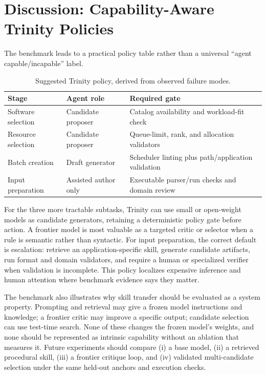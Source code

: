 \documentclass[conference]{IEEEtran}
\begin{document}
\section{Discussion: Capability-Aware Trinity Policies}
The benchmark leads to a practical policy table rather than a universal ``agent capable/incapable'' label.

\begin{table}[t]
\caption{Suggested Trinity policy, derived from observed failure modes.}
\label{tab:policy}
\centering\small\setlength{\tabcolsep}{2pt}
\begin{tabular}{p{}p{}p{}}
\toprule
Stage & Agent role & Required gate \\
\midrule
Software selection & Candidate proposer & Catalog availability and workload-fit check \\
Resource selection & Candidate proposer & Queue-limit, rank, and allocation validators \\
Batch creation & Draft generator & Scheduler linting plus path/application validation \\
Input preparation & Assisted author only & Executable parser/run checks and domain review \\
\bottomrule
\end{tabular}
\end{table}

For the three more tractable subtasks, Trinity can use small or open-weight models as candidate generators, retaining a deterministic policy gate before action. A frontier model is most valuable as a targeted critic or selector when a rule is semantic rather than syntactic. For input preparation, the correct default is escalation: retrieve an application-specific skill, generate candidate artifacts, run format and domain validators, and require a human or specialized verifier when validation is incomplete. This policy localizes expensive inference and human attention where benchmark evidence says they matter.

The benchmark also illustrates why skill transfer should be evaluated as a system property. Prompting and retrieval may give a frozen model instructions and knowledge; a frontier critic may improve a specific output; candidate selection can use test-time search. None of these changes the frozen model's weights, and none should be represented as intrinsic capability without an ablation that measures it. Future experiments should compare (i) a base model, (ii) a retrieved procedural skill, (iii) a frontier critique loop, and (iv) validated multi-candidate selection under the same held-out anchors and execution checks.
\end{document}
